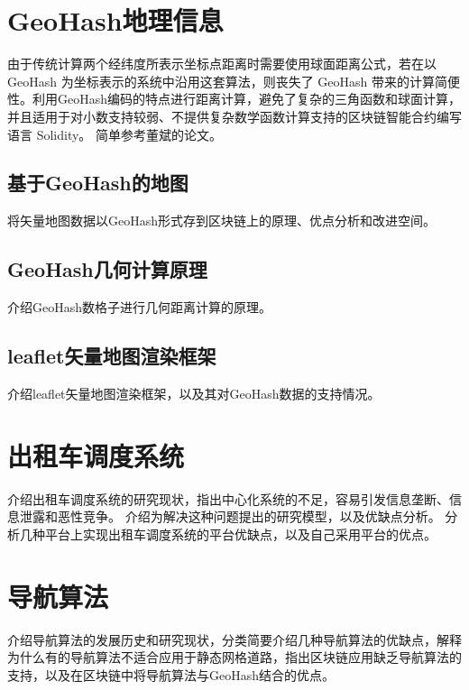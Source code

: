 \section{GeoHash地理信息}
由于传统计算两个经纬度所表示坐标点距离时需要使用球面距离公式，若在以 GeoHash 为坐标表示的系统中沿用这套算法，则丧失了 GeoHash 带来的计算简便性。利用GeoHash编码的特点进行距离计算，避免了复杂的三角函数和球面计算，并且适用于对小数支持较弱、不提供复杂数学函数计算支持的区块链智能合约编写语言 Solidity。
简单参考董斌的论文。
\subsection{基于GeoHash的地图}
将矢量地图数据以GeoHash形式存到区块链上的原理、优点分析和改进空间。
\subsection{GeoHash几何计算原理}
介绍GeoHash数格子进行几何距离计算的原理。
\subsection{leaflet矢量地图渲染框架}
介绍leaflet矢量地图渲染框架，以及其对GeoHash数据的支持情况。

\section{出租车调度系统}
介绍出租车调度系统的研究现状，指出中心化系统的不足，容易引发信息垄断、信息泄露和恶性竞争。
介绍为解决这种问题提出的研究模型，以及优缺点分析。
分析几种平台上实现出租车调度系统的平台优缺点，以及自己采用平台的优点。
\section{导航算法}



介绍导航算法的发展历史和研究现状，分类简要介绍几种导航算法的优缺点，解释为什么有的导航算法不适合应用于静态网格道路，指出区块链应用缺乏导航算法的支持，以及在区块链中将导航算法与GeoHash结合的优点。



